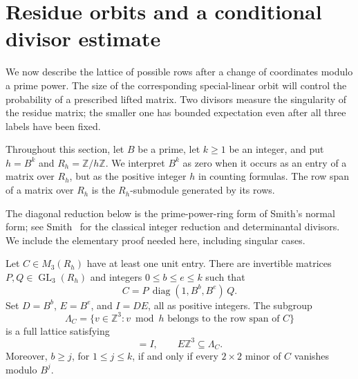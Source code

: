 \section{Residue orbits and a conditional divisor estimate}
\label{orb:section}

We now describe the lattice of possible rows after a change of coordinates
modulo a prime power.  The size of the corresponding special-linear orbit
will control the probability of a prescribed lifted matrix.  Two divisors
measure the singularity of the residue matrix; the smaller one has bounded
expectation even after all three labels have been fixed.

Throughout this section, let $B$ be a prime, let $k\geq 1$ be an
integer, and put $h=B^k$ and $R_h=\mathbb Z/h\mathbb Z$.  We interpret
$B^k$ as zero when it occurs as an entry of a matrix over $R_h$, but as the
positive integer $h$ in counting formulas.  The row span of a matrix over
$R_h$ is the $R_h$-submodule generated by its rows.

The diagonal reduction below is the prime-power-ring form of Smith's
normal form; see Smith~\cite[Articles~12--16]{Smith1861} for the classical
integer reduction and determinantal divisors. We include the elementary
proof needed here, including singular cases.

\begin{lemma}
\label{orb:diagonal}
Let $C\in M_3(R_h)$ have at least one unit entry.  There are invertible
matrices $P,Q\in\operatorname{GL}_3(R_h)$ and integers
$0\leq b\leq e\leq k$ such that
\[
 C=P\,\operatorname{diag}(1,B^b,B^e)\,Q.
\]
Set $D=B^b$, $E=B^e$, and $I=DE$, all as positive integers.  The subgroup
\[
 \Lambda_C=\{v\in\mathbb Z^3:
       v\bmod h\text{ belongs to the row span of }C\}
\]
is a full lattice satisfying
\begin{equation}
 [\mathbb Z^3:\Lambda_C]=I,
 \qquad E\mathbb Z^3\subseteq\Lambda_C.
 \label{orb:lattice}
\end{equation}
Moreover, $b\geq j$, for $1\leq j\leq k$, if and only if every
$2\times2$ minor of $C$ vanishes modulo $B^j$.
\end{lemma}

